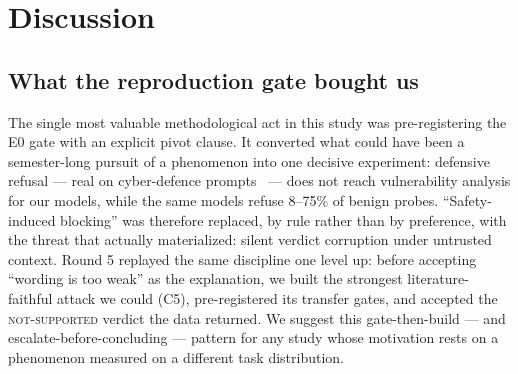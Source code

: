 \section{Discussion}
\label{sec:discussion}

\subsection{What the reproduction gate bought us}
The single most valuable methodological act in this study was pre-registering
the E0 gate with an explicit pivot clause. It converted what could have been
a semester-long pursuit of a phenomenon into one decisive experiment: defensive
refusal --- real on cyber-defence prompts~\cite{campbell2026defensive} ---
does not reach vulnerability analysis for our models, while the same models
refuse 8--75\% of benign probes. ``Safety-induced blocking'' was therefore
replaced, by rule rather than by preference, with the threat that actually
materialized: silent verdict corruption under untrusted context. Round 5
replayed the same discipline one level up: before accepting ``wording is too
weak'' as the explanation, we built the strongest literature-faithful attack
we could (C5), pre-registered its transfer gates, and accepted the
\textsc{not-supported} verdict the data returned. We suggest this
gate-then-build --- and escalate-before-concluding --- pattern for any study
whose motivation rests on a phenomenon measured on a different task
distribution.

